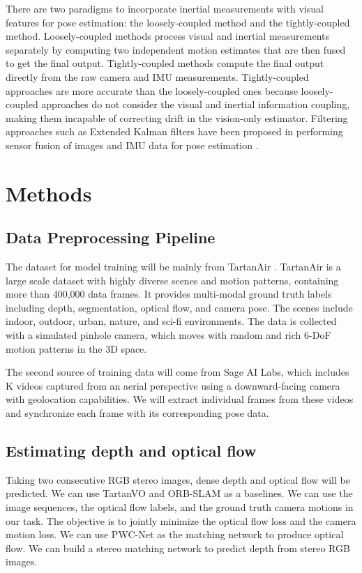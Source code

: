 \documentclass[10pt,letterpaper]{article}
\begin{document}
There are two paradigms to incorporate inertial measurements with visual features for pose estimation: the loosely-coupled method and the tightly-coupled method.  Loosely-coupled methods process visual and inertial measurements separately by computing two independent motion estimates that are then fused to get the final output. Tightly-coupled methods compute the final output directly from the raw camera and IMU measurements. Tightly-coupled approaches are more accurate than the loosely-coupled ones because loosely-coupled approaches do not consider the visual and inertial information coupling, making them incapable of correcting drift in the vision-only estimator. Filtering approaches such as Extended Kalman filters have been proposed in performing sensor fusion of images and IMU data for pose estimation \cite{bloesch2015robust}.

\section*{Methods}
\subsection*{Data Preprocessing Pipeline}
The dataset for model training will be mainly from TartanAir \cite{tartanair2020iros}. TartanAir is a large scale dataset with highly diverse scenes and motion patterns, containing more than 400,000 data frames. It provides multi-modal ground truth labels including depth, segmentation, optical flow, and camera pose. The scenes include indoor, outdoor, urban, nature, and sci-fi environments. The data is collected with a simulated pinhole camera, which moves with random and rich 6-DoF motion patterns in the 3D space.

The second source of training data will come from Sage AI Labs, which includes K videos captured from an aerial perspective using a downward-facing camera with geolocation capabilities. We will extract individual frames from these videos and synchronize each frame with its corresponding pose data.

\subsection*{Estimating depth and optical flow}
Taking two consecutive RGB stereo images, dense depth and optical flow will be predicted. We can use TartanVO and ORB-SLAM \cite{orb} as a baselines. We can use the image sequences, the optical flow labels, and the ground truth camera motions in our task. The objective is to jointly minimize the optical flow loss and the camera motion loss. We can use PWC-Net as the matching network to produce optical flow. We can build a stereo matching network to predict depth from stereo RGB images.
\end{document}

